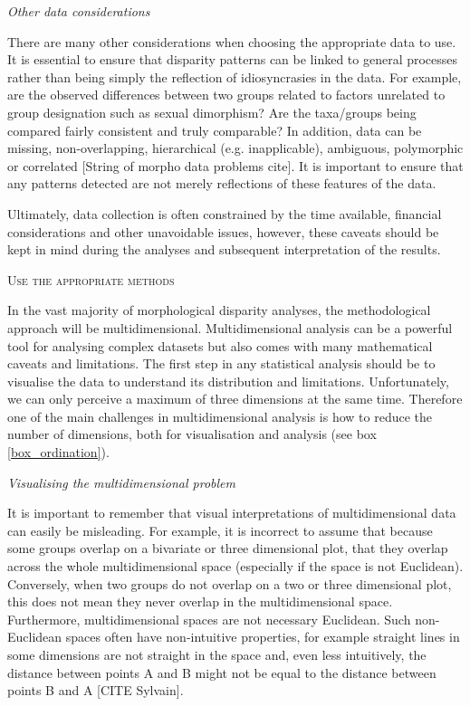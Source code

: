 \documentclass[12pt,letterpaper]{article}
\renewcommand{\section}[1]{%
\bigskip
\begin{center}
\begin{Large}
\normalfont\scshape #1
\medskip
\end{Large}
\end{center}}
\renewcommand{\subsection}[1]{%
\bigskip
\begin{center}
\begin{large}
\normalfont\itshape #1
\end{large}
\end{center}}
\begin{document}
\subsection{Other data considerations}
There are many other considerations when choosing the appropriate data to use. 
It is essential to ensure that disparity patterns can be linked to general processes rather than being simply the reflection of idiosyncrasies in the data.
For example, are the observed differences between two groups related to factors unrelated to group designation such as sexual dimorphism?
Are the taxa/groups being compared fairly consistent and truly comparable?
In addition, data can be missing, non-overlapping, hierarchical (e.g. inapplicable), ambiguous, polymorphic or correlated [String of morpho data problems cite].
It is important to ensure that any patterns detected are not merely reflections of these features of the data.

Ultimately, data collection is often constrained by the time available, financial considerations and other unavoidable issues, however, these caveats should be kept in mind during the analyses and subsequent interpretation of the results.

\section{Use the appropriate methods} 
In the vast majority of morphological disparity analyses, the methodological approach will be multidimensional.
Multidimensional analysis can be a powerful tool for analysing complex datasets but also comes with many mathematical caveats and limitations.
The first step in any statistical analysis should be to visualise the data to understand its distribution and limitations.
Unfortunately, we can only perceive a maximum of three dimensions at the same time.
Therefore one of the main challenges in multidimensional analysis is how to reduce the number of dimensions, both for visualisation and analysis (see box \ref{box_ordination}).

\subsection{Visualising the multidimensional problem}
\label{visualisation}
It is important to remember that visual interpretations of multidimensional data can easily be misleading.
For example, it is incorrect to assume that because some groups overlap on a bivariate or three dimensional plot, that they overlap across the whole multidimensional space (especially if the space is not Euclidean).
Conversely, when two groups do not overlap on a two or three dimensional plot, this does not mean they never overlap in the multidimensional space.
Furthermore, multidimensional spaces are not necessary Euclidean.
Such non-Euclidean spaces often have non-intuitive properties, for example straight lines in some dimensions are not straight in the space and, even less intuitively, the distance between points A and B might not be equal to the distance between points B and A [CITE Sylvain].
\end{document}
